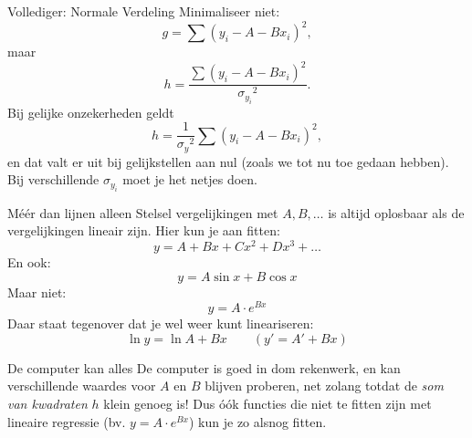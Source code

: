 \documentclass{beamer}
\begin{document}
\begin{frame}{Vollediger: Normale Verdeling}
  Minimaliseer \alert{niet}:
  \begin{equation*}
    g = \sum(y_i - A - Bx_i)^2,
  \end{equation*}
  maar
  \begin{equation*}
    h = \frac{\sum(y_i - A - Bx_i)^2}{{\sigma_{y_i}}^2}.
  \end{equation*}
  Bij gelijke onzekerheden geldt
  \begin{equation*}
    h = \frac{1}{{\sigma_y}^2}\sum(y_i - A - Bx_i)^2,
  \end{equation*}
  en dat valt er uit bij gelijkstellen aan nul (zoals we tot nu toe gedaan hebben). Bij verschillende $\sigma_{y_i}$ moet je het netjes doen.
\end{frame}

\begin{frame}{Méér dan lijnen alleen}
  Stelsel vergelijkingen met $A, B, \ldots$ is altijd oplosbaar als de vergelijkingen \alert{lineair} zijn. Hier kun je aan fitten:
  \begin{equation*}
    y = A + Bx + Cx^2 + Dx^3 + \ldots
  \end{equation*}
  \pause
  En ook:
  \begin{equation*}
    y = A\sin x + B\cos x
  \end{equation*}
  \pause
  Maar niet:
  \begin{equation*}
    y = A\cdot e^{Bx}
  \end{equation*}
  \pause
  Daar staat tegenover dat je wel weer kunt \alert{lineariseren}:
  \begin{equation*}
    \ln y = \ln A + Bx  \qquad (y' = A' + Bx)
  \end{equation*}
\end{frame}

\begin{frame}{De computer kan alles}
  De computer is goed in dom rekenwerk, en kan verschillende waardes voor $A$ en $B$ blijven proberen, net zolang totdat de \emph{som van kwadraten} $h$ klein genoeg is! Dus óók functies die niet te fitten zijn met lineaire regressie (bv. $y = A\cdot e^{Bx}$) kun je zo alsnog fitten.
\end{frame}
\end{document}
